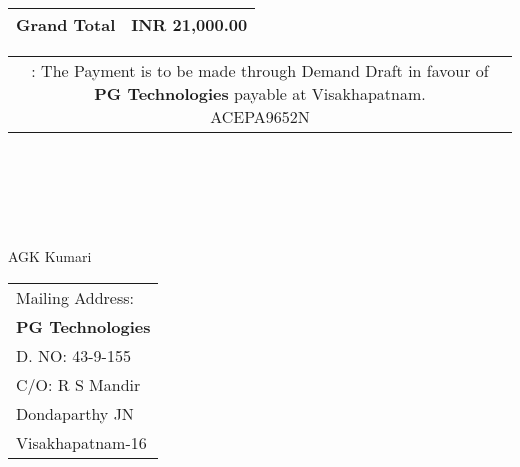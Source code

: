 \documentclass[11pt]{article}
\begin{document}
\vspace*{0.45cm}

\hspace*{11.7cm}
\begin{tabular}{|c|r|}
\hline
{\bf Grand Total} & INR 21,000.00 \\
\hline
\end{tabular}

\vspace*{-0.45cm}
\hspace*{-0.65cm}
\begin{tabular}{c}
\parbox{4in}{ : The Payment is to be made through Demand Draft in favour of {\bf PG Technologies} payable at Visakhapatnam. \\
 ACEPA9652N}\\
\end{tabular}
\vspace*{95pt}


 \\ \\ \\ \\ \\
 \hspace*{0.2cm}AGK Kumari
\vspace*{-71pt}
\begin{flushright}
\begin{tabular}{l}
Mailing Address:\\
{\bf PG Technologies}\\
D. NO: 43-9-155\\
C/O: R  S Mandir\\
Dondaparthy JN\\ 
Visakhapatnam-16\\
\end{tabular}
\end{flushright}
\end{document}
